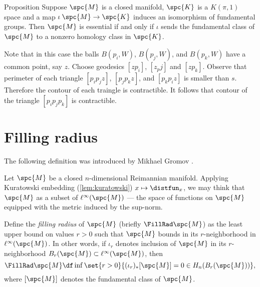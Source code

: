 \begin{thm}{Proposition}
Suppose $\spc{M}$ is a closed manifold, 
$\spc{K}$ is a $K(\pi,1)$ space and a map $\iota\:\spc{M}\to \spc{K}$ induces an isomorphism of fundamental groups.
Then $\spc{M}$ is essential if and only if $\iota$ sends the fundamental class of $\spc{M}$ to a nonzero homology class in $\spc{K}$.
\end{thm}















Note that in this case the balls $B(p_i,W)$, $B(p_j,W)$, and $B(p_k,W)$
have a common point, say $z$.
Choose geodesics $[zp_i]$, $[z_pj]$ and $[zp_k]$.
Observe that perimeter of each triangle $[p_ip_jz]$, $[p_jp_kz]$, and $[p_kp_iz]$ is smaller than $s$.
Therefore the contour of each traingle is contractible.
It follows that contour of the triangle $[p_ip_jp_k]$ is contractible.













\section{Filling radius}

The following definition was introduced by Mikhael Gromov \cite{gromov-1983}.

Let $\spc{M}$ be a closed $n$-dimensional Reimannian manifold.
Applying Kuratowski embedding (\ref{lem:kuratowski}) $x\mapsto \distfun_x$, we may think that $\spc{M}$ as a subset of $\ell^\infty(\spc{M})$ --- the space of functions on $\spc{M}$ equipped with the metric induced by the sup-norm.

Define the \emph{filling radius} of $\spc{M}$ (briefly $\FillRad\spc{M}$) as the least upper bound on values $r>0$ such that $\spc{M}$ bounds in its $r$-neighborhood in $\ell^\infty(\spc{M})$.
In other words, if $\iota_r$ denotes inclusion of $\spc{M}$ in its $r$-neighborhood $B_r(\spc{M})\subset \ell^\infty(\spc{M})$,
then 
\[\FillRad\spc{M}\df\inf\set{r>0}{(\iota_r)_*[\spc{M}]=0\in H_n(B_r(\spc{M}))},\]
where $[\spc{M}]$ denotes the fundamental class of $\spc{M}$.

